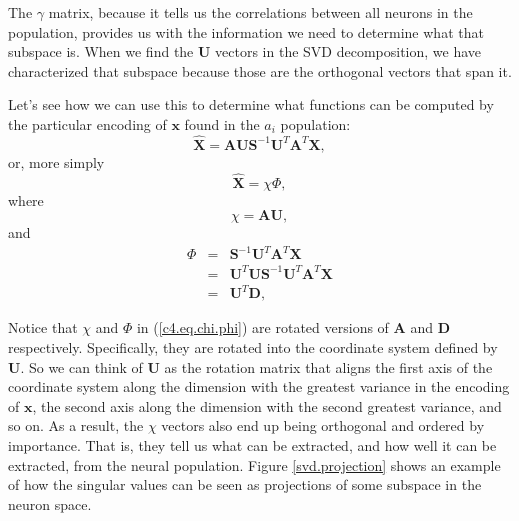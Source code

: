\documentclass[10pt,letterpaper,oneside]{article}
\begin{document}
The $\gamma$ matrix, because it tells us the correlations between
all neurons in the population, provides us with the information we
need to determine what that subspace is. When we find the $\mathbf{U}$
vectors in the SVD decomposition, we have characterized that subspace
because those are the orthogonal vectors that span it. 

Let's see how we can use this to determine what functions can be computed
by the particular encoding of $\mathbf{x}$ found in the $a_{i}$
population: 
\[
\hat{\mathbf{X}}=\mathbf{AUS}^{-1}\mathbf{U}^{T}\mathbf{A}^{T}\mathbf{X},
\]
 or, more simply
\begin{equation}
\hat{\mathbf{X}}=\chi\Phi,\label{c4.eq.chi.phi}
\end{equation}
 where 
\[
\chi=\mathbf{AU},
\]
and
\begin{eqnarray*}
\Phi & = & \mathbf{S}^{-1}\mathbf{U}^{T}\mathbf{A}^{T}\mathbf{X}\\
 & = & \mathbf{U}^{T}\mathbf{US}^{-1}\mathbf{U}^{T}\mathbf{A}^{T}\mathbf{X}\\
 & = & \mathbf{U}^{T}\mathbf{D},
\end{eqnarray*}
 
Notice that $\chi$ and $\Phi$ in (\ref{c4.eq.chi.phi}) are rotated
versions of $\mathbf{A}$ and $\mathbf{D}$ respectively. Specifically,
they are rotated into the coordinate system defined by $\mathbf{U}$.
So we can think of $\mathbf{U}$ as the rotation matrix that aligns
the first axis of the coordinate system along the dimension with the
greatest variance in the encoding of $\mathbf{x}$, the second axis
along the dimension with the second greatest variance, and so on.
As a result, the $\chi$
vectors also end up being orthogonal and ordered by importance. That
is, they tell us what can be extracted, and how well it can be extracted,
from the neural population. Figure \ref{svd.projection} shows an example of how the singular values can be seen as projections of some subspace in the neuron space.
\end{document}
